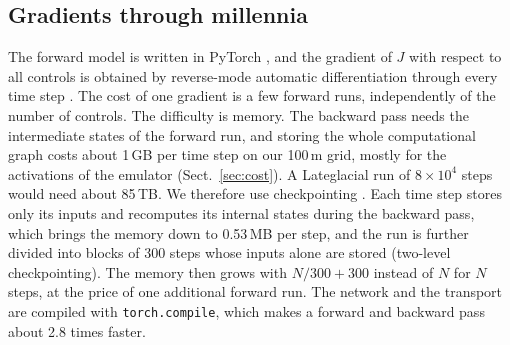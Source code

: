 \documentclass[tc, manuscript]{copernicus}
\begin{document}
\subsection{Gradients through millennia}
\label{sec:gradients}

The forward model is written in PyTorch \citep{paszke2019}, and the gradient of $J$ with respect to all controls is obtained by reverse-mode automatic differentiation through every time step \citep{baydin2018,griewank2008}. The cost of one gradient is a few forward runs, independently of the number of controls. The difficulty is memory. The backward pass needs the intermediate states of the forward run, and storing the whole computational graph costs about 1\,GB per time step on our 100\,m grid, mostly for the activations of the emulator (Sect.~\ref{sec:cost}). A Lateglacial run of $8\times10^4$ steps would need about 85\,TB. We therefore use checkpointing \citep{griewank2000,chen2016}. Each time step stores only its inputs and recomputes its internal states during the backward pass, which brings the memory down to 0.53\,MB per step, and the run is further divided into blocks of 300 steps whose inputs alone are stored (two-level checkpointing). The memory then grows with $N/300+300$ instead of $N$ for $N$ steps, at the price of one additional forward run. The network and the transport are compiled with \texttt{torch.compile}, which makes a forward and backward pass about 2.8 times faster.
\end{document}
